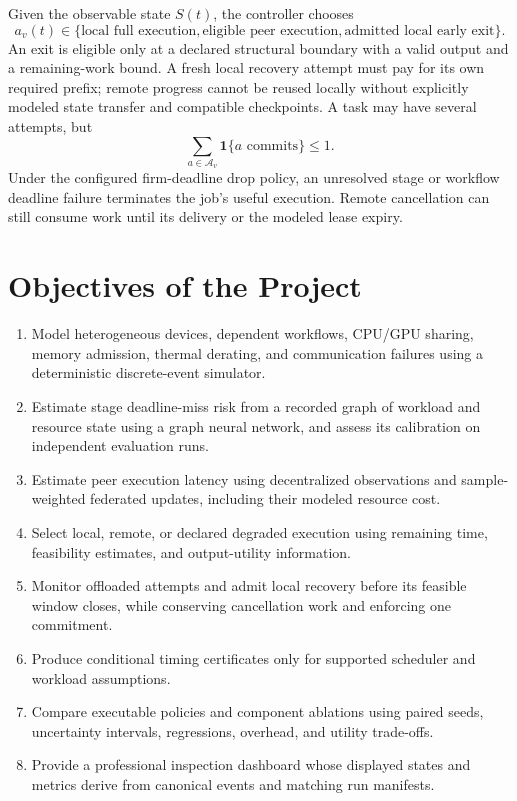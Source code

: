 \documentclass[11pt,a4paper]{article}
\begin{document}
Given the observable state $S(t)$, the controller chooses
\begin{equation}
 a_v(t)\in\{\text{local full execution},\text{eligible peer execution},
 \text{admitted local early exit}\}.
\end{equation}
An exit is eligible only at a declared structural boundary with a valid output
and a remaining-work bound. A fresh local recovery attempt must pay for its own
required prefix; remote progress cannot be reused locally without explicitly
modeled state transfer and compatible checkpoints. A task may have several attempts, but
\begin{equation}
 \sum_{a\in\mathcal A_v}\mathbf 1\{a\text{ commits}\}\leq 1.
\end{equation}
Under the configured firm-deadline drop policy, an unresolved stage or workflow
deadline failure terminates the job's useful execution. Remote cancellation can
still consume work until its delivery or the modeled lease expiry.

\section{Objectives of the Project}
\begin{enumerate}
\item Model heterogeneous devices, dependent workflows, CPU/GPU sharing,
memory admission, thermal derating, and communication failures using a
deterministic discrete-event simulator.
\item Estimate stage deadline-miss risk from a recorded graph of workload and
resource state using a graph neural network, and assess its calibration on
independent evaluation runs.
\item Estimate peer execution latency using decentralized observations and
sample-weighted federated updates, including their modeled resource cost.
\item Select local, remote, or declared degraded execution using remaining
time, feasibility estimates, and output-utility information.
\item Monitor offloaded attempts and admit local recovery before its feasible
window closes, while conserving cancellation work and enforcing one commitment.
\item Produce conditional timing certificates only for supported scheduler
and workload assumptions.
\item Compare executable policies and component ablations using paired seeds,
uncertainty intervals, regressions, overhead, and utility trade-offs.
\item Provide a professional inspection dashboard whose displayed states and
metrics derive from canonical events and matching run manifests.
\end{enumerate}
\end{document}
